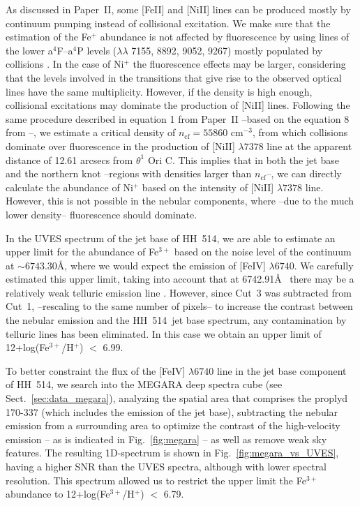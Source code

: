 \documentclass[fleqn,usenatbib]{mnras}
\begin{document}
As discussed in Paper~II, some [Fe\thinspace II] and [Ni\thinspace II] lines can be produced mostly by continuum pumping instead of collisional excitation. We make sure that the estimation of the Fe$^+$ abundance is not affected by fluorescence by using lines of the lower  a$^4$F--a$^4$P levels  ($\lambda \lambda$ 7155, 8892, 9052, 9267) mostly populated by collisions \citep{Baldwin96}. In the case of Ni$^+$ the fluorescence effects may be larger, considering that the  levels involved in the transitions that give rise to the observed optical lines have the same multiplicity. However, if the density is high enough, collisional excitations may dominate the production of [Ni\thinspace II] lines. Following the same procedure described in equation 1 from Paper~II --based on the equation 8 from \citet{Bautista96}--, we estimate a critical density of $n_{\text{cf}}= 55860 \text{ cm}^{-3}$, from which collisions dominate over  fluorescence in the production of [Ni\thinspace II] $\lambda 7378$ line at the apparent distance of 12.61 arcsecs from $\theta^1$ Ori C. This implies that in both the jet base and the northern knot --regions with densities larger than $n_{\text{cf}}$--, we can directly calculate the abundance of Ni$^{+}$ based on the intensity of [Ni\thinspace II] $\lambda 7378$ line. However, this is not possible in the nebular components, where --due to the much lower density-- fluorescence should dominate.

In the UVES spectrum of the jet base of HH~514, we are able to estimate an upper limit for the abundance of Fe$^{3+}$ based on the noise level of the continuum at $\sim 6743.30$\AA, where we would expect the emission of [Fe\thinspace IV] $\lambda6740$. We carefully estimated this upper limit, taking into account that at 6742.91\AA~ there may be a relatively weak telluric emission line \citep[][]{Hanuschik03}. However, since Cut~3 was subtracted from Cut~1, --rescaling to the same number of pixels-- to increase the contrast between the nebular emission and the HH~514~jet base spectrum, any contamination by telluric lines has been eliminated. In this case we obtain an upper limit of 12+log(Fe$^{3+}$/H$^+$) $<$ 6.99.

To better constraint the flux of the [Fe\thinspace IV] $\lambda6740$ line in the jet base component of HH~514, we search into the MEGARA deep spectra cube (see Sect.~\ref{sec:data_megara}), analyzing the spatial area that comprises the proplyd 170-337 (which includes the emission of the jet base), subtracting the nebular emission from a surrounding area to optimize the contrast of the high-velocity emission -- as is indicated in Fig.~\ref{fig:megara} -- as well as remove weak sky features. The resulting 1D-spectrum is shown in Fig.~\ref{fig:megara_vs_UVES}, having a higher SNR than the UVES spectra, although with lower spectral resolution. This spectrum allowed us to restrict the upper limit the Fe$^{3+}$ abundance to   12+log(Fe$^{3+}$/H$^+$) $<$ 6.79.
\end{document}
